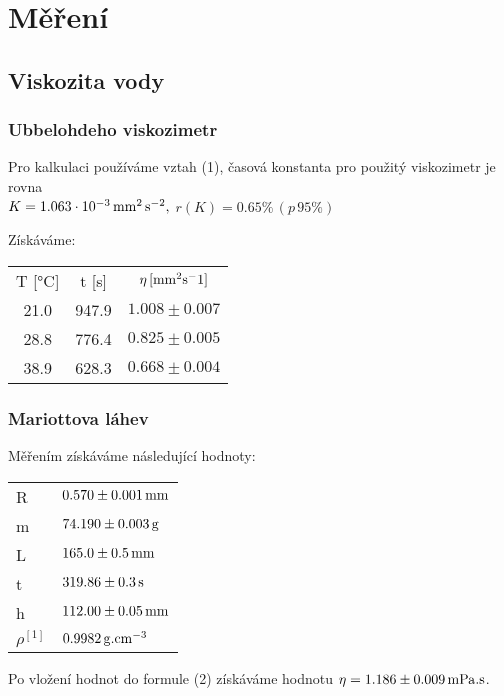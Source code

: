 \documentclass[czech,11pt,a4paper]{article}
\begin{document}
	\section{Měření}
	\subsection{Viskozita vody}
	\subsubsection{Ubbelohdeho viskozimetr}
	Pro kalkulaci používáme vztah (1), časová konstanta pro použitý viskozimetr je rovna \\ $K = 1.063 \cdot 10^{-3 } \,\rm mm^2 \,s^{-2},$ $ r(K) = 0.65 \% \, (p \,95\%)$ 
	
   Získáváme:
   	
   	\begin{center}
   		
   	\begin{tabular}{c|c|c}
   		\hline
   		T [°C] & t [s] & $\eta \,\rm [mm^2 s^-1]$ \\
   		21.0   & 947.9 & $ 1.008 \pm 0.007$ \\
   		28.8   & 776.4 & $0.825 \pm 0.005$  \\
   		38.9   & 628.3 & $0.668 \pm 0.004$ 
   	\end{tabular}
   	
   	\end{center}
   	
   	\subsubsection{Mariottova láhev}
   	Měřením získáváme následující hodnoty:
   	\begin{center}
   		\begin{tabular}{l|l}
   		\hline
   		
   		R      & $0.570 \pm 0.001 \,\rm mm$  \\
   		m      & $74.190 \pm 0.003 \,\rm g$  \\
   		L      & $165.0 \pm 0.5 \,\rm mm$    \\
   		t      & $319.86 \pm 0.3 \,\rm s$    \\
   		h      & $112.00 \pm 0.05 \,\rm mm$  \\
   		$\rho^{[1]}$  & $0.9982 \,\rm g.cm^{-3}$        
   	\end{tabular}
   	
   	\end{center}
   Po vložení hodnot do formule (2) získáváme hodnotu $\eta = 1.186 \pm 0.009 \,\rm mPa.s$.
\end{document}
